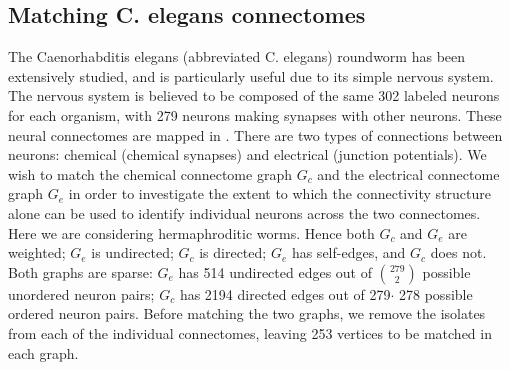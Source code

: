\documentclass[12pt]{article}
\numberwithin{equation}{section}
\theoremstyle{definition}
\begin{document}

\subsection{Matching C.\! elegans connectomes}
\label{S:cel}
The Caenorhabditis elegans (abbreviated C.\! elegans) roundworm has been
extensively studied, and is particularly useful due to its simple
nervous system.  The nervous system is believed to be composed of the
same 302 labeled neurons for each organism, with 279 neurons making
synapses with other neurons.  These neural connectomes are mapped in
\cite{vcel}.
There are two types of connections between neurons: chemical (chemical
synapses) and electrical (junction potentials).  We wish to match the
chemical connectome graph $G_c$ and the electrical connectome graph
$G_e$ in order to investigate the extent to which the connectivity
structure alone can be used to identify individual neurons across the
two connectomes.  Here we are considering hermaphroditic worms.  Hence
both $G_c$ and $G_e$ are weighted; $G_e$ is undirected; $G_c$ is
directed; $G_e$ has self-edges, and $G_c$ does not.  Both graphs are
sparse: $G_e$ has 514 undirected edges out of $\binom{279}{2}$ possible
unordered neuron pairs; $G_c$ has 2194 directed edges out of 279$\cdot$
278 possible ordered  neuron pairs.  Before matching the two graphs, we
remove the isolates from each of the individual connectomes, leaving 253
vertices to be matched in each graph.
\end{document}
